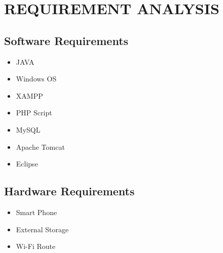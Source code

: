 \chapter{REQUIREMENT ANALYSIS}
\section{Software Requirements}

\begin{itemize}
\item JAVA 
\item Windows OS     
\item XAMPP
\item PHP Script
\item MySQL
\item Apache Tomcat
\item Eclipse 
\end{itemize}

\section{Hardware Requirements}

\begin{itemize}
\item Smart Phone 
\item External Storage     
\item Wi-Fi Route
\end{itemize}

